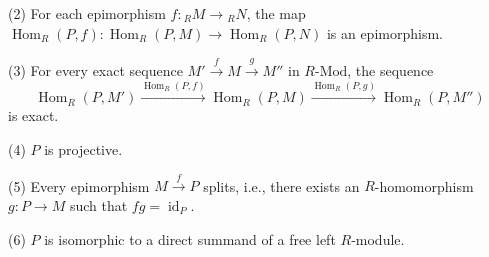 \documentclass[11pt, a4paper]{report}
\begin{document}
(2) For each epimorphism $f\colon {}_{R}M \to {}_{R}N$, the map $\operatorname{Hom}_{R}(P, f)\colon \operatorname{Hom}_{R}(P, M) \to \operatorname{Hom}_{R}(P, N)$ is an epimorphism.

(3) For every exact sequence $M' \xrightarrow{f} M \xrightarrow{g} M''$ in $R\text{-}\mathrm{Mod}$, the sequence
\[
\operatorname{Hom}_{R}(P, M') \xrightarrow{\operatorname{Hom}_{R}(P, f)} \operatorname{Hom}_{R}(P, M) \xrightarrow{\operatorname{Hom}_{R}(P, g)} \operatorname{Hom}_{R}(P, M'')
\]
is exact.

(4) $P$ is projective.

(5) Every epimorphism $M \xrightarrow{f} P$ splits, i.e., there exists an $R$-homomorphism $g\colon P \to M$ such that $fg=\operatorname{id}_{P}$.

(6) $P$ is isomorphic to a direct summand of a free left $R$-module.
\end{document}

